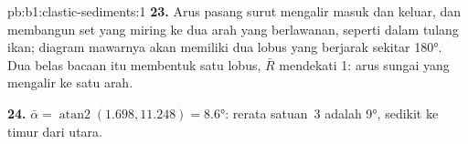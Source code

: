 \begin{solution}{pb:b1:clastic-sediments:1}
\textbf{23.} Arus pasang surut mengalir masuk dan keluar, dan membangun set yang miring ke dua arah yang berlawanan, seperti dalam  tulang ikan; diagram mawarnya akan memiliki dua lobus yang berjarak sekitar \ang{180}. Dua belas bacaan itu membentuk satu lobus, $\bar R$ mendekati 1: arus sungai yang mengalir ke satu arah.

\textbf{24.} $\bar\alpha = \operatorname{atan2}(1.698, 11.248) = \ang{8.6}$:   rerata satuan~3 adalah \ang{9}, sedikit ke timur dari utara.
\end{solution}
